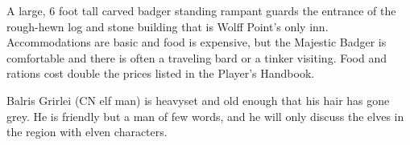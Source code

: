 A large, 6 foot tall carved badger standing rampant guards the entrance of the rough-hewn log and stone building that is Wolff Point's only inn.
Accommodations are basic and food is expensive, but the Majestic Badger is comfortable and there is often a traveling bard or a tinker visiting.
Food and rations cost double the prices listed in the Player's Handbook.

Balris Grirlei (CN elf man) is heavyset and old enough that his hair has gone grey.
He is friendly but a man of few words, and he will only discuss the elves in the region with elven characters.
